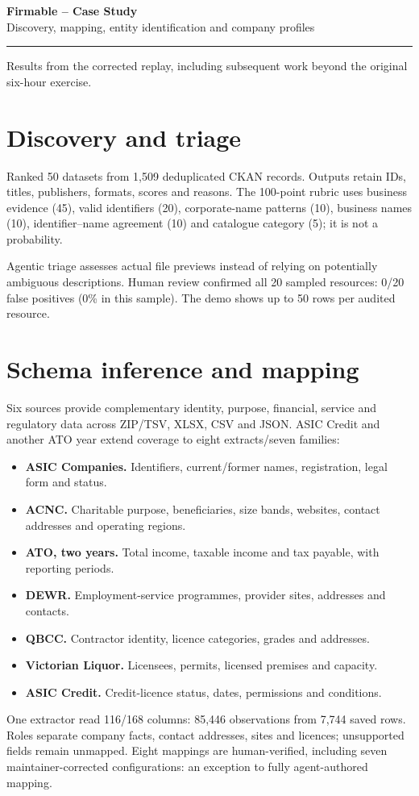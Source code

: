 \documentclass[10pt,a4paper]{article}
\begin{document}
\begin{center}{\Large\bfseries Firmable -- Case Study}\\[4pt]
Discovery, mapping, entity identification and company profiles\end{center}
\vspace{2pt}\hrule\vspace{5pt}
Results from the corrected replay, including subsequent work beyond the original six-hour exercise.\par
\section{Discovery and triage}
Ranked 50 datasets from 1,509 deduplicated CKAN records. Outputs retain IDs, titles, publishers, formats, scores and reasons. The 100-point rubric uses business evidence (45), valid identifiers (20), corporate-name patterns (10), business names (10), identifier--name agreement (10) and catalogue category (5); it is not a probability.\par
Agentic triage assesses actual file previews instead of relying on potentially ambiguous descriptions. Human review confirmed all 20 sampled resources: 0/20 false positives (0\% in this sample). The demo shows up to 50 rows per audited resource.\par
\section{Schema inference and mapping}
Six sources provide complementary identity, purpose, financial, service and regulatory data across ZIP/TSV, XLSX, CSV and JSON. ASIC Credit and another ATO year extend coverage to eight extracts/seven families:\par
\begin{itemize}
\item \textbf{ASIC Companies.} Identifiers, current/former names, registration, legal form and status.
\item \textbf{ACNC.} Charitable purpose, beneficiaries, size bands, websites, contact addresses and operating regions.
\item \textbf{ATO, two years.} Total income, taxable income and tax payable, with reporting periods.
\item \textbf{DEWR.} Employment-service programmes, provider sites, addresses and contacts.
\item \textbf{QBCC.} Contractor identity, licence categories, grades and addresses.
\item \textbf{Victorian Liquor.} Licensees, permits, licensed premises and capacity.
\item \textbf{ASIC Credit.} Credit-licence status, dates, permissions and conditions.
\end{itemize}
One extractor read 116/168 columns: 85,446 observations from 7,744 saved rows. Roles separate company facts, contact addresses, sites and licences; unsupported fields remain unmapped. Eight mappings are human-verified, including seven maintainer-corrected configurations: an exception to fully agent-authored mapping.\par
\end{document}
